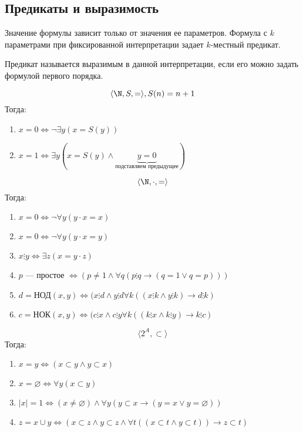 \subsection{Предикаты и выразимость}

Значение формулы зависит только от значения ее параметров. Формула с $k$ параметрами при фиксированной интерпретации задает $k$-местный предикат.

\begin{definition}
    Предикат называется выразимым в данной интерпретации, если его можно задать формулой первого порядка.
\end{definition}


\begin{example}
    $$\langle \N, S, = \rangle, S(n) = n + 1$$
    Тогда:
    \begin{enumerate}
        \item $x = 0 \Leftrightarrow \neg \exists y (x = S(y))$
        \item $x = 1 \Leftrightarrow \exists y (x = S(y) \wedge \underbrace{y = 0}_{\text{подставляем предыдущее}})$
    \end{enumerate}
\end{example}

\begin{example}
    $$\langle \N, \cdot, = \rangle$$
    Тогда:
    \begin{enumerate}
        \item $x = 0 \Leftrightarrow \neg \forall y (y\cdot x = x)$
        \item $x = 0 \Leftrightarrow \neg \forall y (y\cdot x = y)$
        \item $x \vdots y \Leftrightarrow \exists z (x = y\cdot z)$
        \item $p$ --- простое $\Leftrightarrow (p \ne 1 \wedge \forall q(p \vdots q \rightarrow (q = 1 \vee q = p)))$
        \item $d = \text{НОД}(x, y) \Leftrightarrow (x \vdots d \wedge y \vdots d \forall k ((x \vdots k \wedge y \vdots k) \rightarrow d \vdots k)$
        \item $c = \text{НОК}(x, y) \Leftrightarrow (c \vdots x \wedge c \vdots y \forall k ((k \vdots x \wedge k \vdots y) \rightarrow k \vdots c)$
    \end{enumerate}
\end{example}

\begin{example}
    $$\langle 2^A, \subset \rangle$$
    Тогда:
    \begin{enumerate}
        \item $x = y \Leftrightarrow (x \subset y \wedge y \subset x)$
        \item $x = \varnothing \Leftrightarrow \forall y (x \subset y)$
        \item $|x| = 1 \Leftrightarrow (x \ne \varnothing) \wedge \forall y (y \subset x \rightarrow (y = x \vee y = \varnothing))$
        \item $z = x \cup y \Leftrightarrow (x \subset z \wedge y \subset z \wedge \forall t((x \subset t \wedge y \subset t)) \rightarrow z \subset t)$
    \end{enumerate}
\end{example}